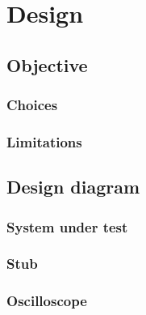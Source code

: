 \chapter{Design}
    \section{Objective}
        \subsection{Choices}
        \subsection{Limitations}
    \section{Design diagram}
        \subsection{System under test}
        \subsection{Stub}
        \subsection{Oscilloscope}
